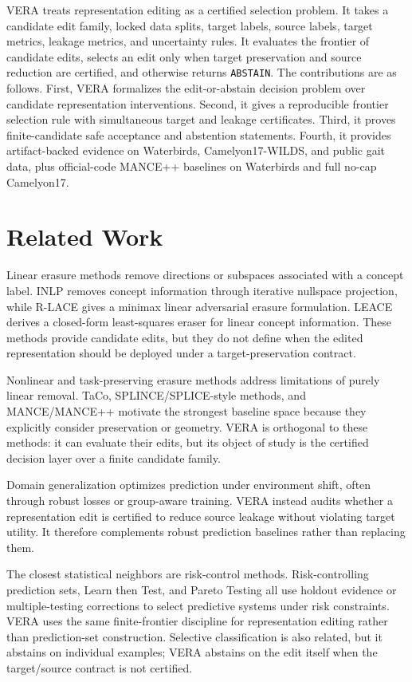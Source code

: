 \documentclass[10pt,twocolumn]{article}
\begin{document}
VERA treats representation editing as a certified selection problem. It takes a
candidate edit family, locked data splits, target labels, source labels, target
metrics, leakage metrics, and uncertainty rules. It evaluates the frontier of
candidate edits, selects an edit only when target preservation and source
reduction are certified, and otherwise returns \texttt{ABSTAIN}. The
contributions are as follows. First, VERA formalizes the edit-or-abstain
decision problem over candidate representation interventions. Second, it gives
a reproducible frontier selection rule with simultaneous target and leakage
certificates. Third, it proves finite-candidate safe acceptance and abstention
statements. Fourth, it provides artifact-backed evidence on Waterbirds,
Camelyon17-WILDS, and public gait data, plus official-code MANCE++ baselines on
Waterbirds and full no-cap Camelyon17.

\section{Related Work}

Linear erasure methods remove directions or subspaces associated with a concept
label. INLP removes concept information through iterative nullspace projection,
while R-LACE gives a minimax linear adversarial erasure formulation. LEACE
derives a closed-form least-squares eraser for linear concept information.
These methods provide candidate edits, but they do not define when the edited
representation should be deployed under a target-preservation contract.

Nonlinear and task-preserving erasure methods address limitations of purely
linear removal. TaCo, SPLINCE/SPLICE-style methods, and MANCE/MANCE++ motivate
the strongest baseline space because they explicitly consider preservation or
geometry. VERA is orthogonal to these methods: it can evaluate their edits, but
its object of study is the certified decision layer over a finite candidate
family.

Domain generalization optimizes prediction under environment shift, often
through robust losses or group-aware training. VERA instead audits whether a
representation edit is certified to reduce source leakage without violating
target utility. It therefore complements robust prediction baselines rather
than replacing them.

The closest statistical neighbors are risk-control methods. Risk-controlling
prediction sets, Learn then Test, and Pareto Testing all use holdout evidence
or multiple-testing corrections to select predictive systems under risk
constraints. VERA uses the same finite-frontier discipline for representation
editing rather than prediction-set construction. Selective classification is
also related, but it abstains on individual examples; VERA abstains on the edit
itself when the target/source contract is not certified.
\end{document}

